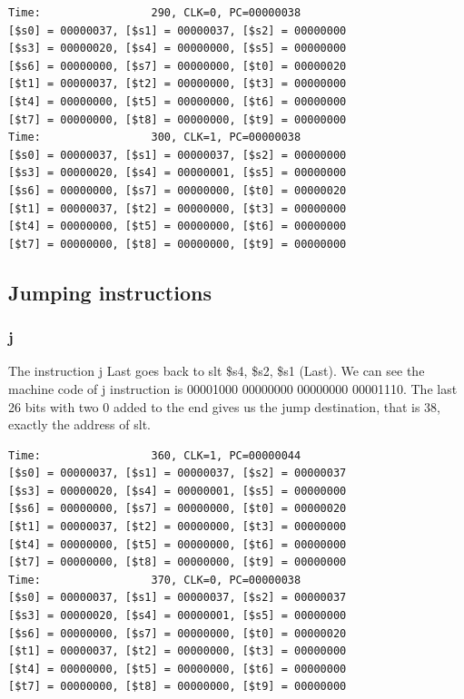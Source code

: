 \documentclass[a4paper,12pt]{article}
\begin{document}
\begin{lstlisting}
Time:                 290, CLK=0, PC=00000038
[$s0] = 00000037, [$s1] = 00000037, [$s2] = 00000000
[$s3] = 00000020, [$s4] = 00000000, [$s5] = 00000000
[$s6] = 00000000, [$s7] = 00000000, [$t0] = 00000020
[$t1] = 00000037, [$t2] = 00000000, [$t3] = 00000000
[$t4] = 00000000, [$t5] = 00000000, [$t6] = 00000000
[$t7] = 00000000, [$t8] = 00000000, [$t9] = 00000000
Time:                 300, CLK=1, PC=00000038
[$s0] = 00000037, [$s1] = 00000037, [$s2] = 00000000
[$s3] = 00000020, [$s4] = 00000001, [$s5] = 00000000
[$s6] = 00000000, [$s7] = 00000000, [$t0] = 00000020
[$t1] = 00000037, [$t2] = 00000000, [$t3] = 00000000
[$t4] = 00000000, [$t5] = 00000000, [$t6] = 00000000
[$t7] = 00000000, [$t8] = 00000000, [$t9] = 00000000
\end{lstlisting}

\subsection{Jumping instructions}
\subsubsection{j}
\par The instruction j Last goes back to slt \$s4, \$s2, \$s1 (Last). We can see the machine code of j instruction is 00001000 00000000 00000000 00001110. The last 26 bits with two 0 added to the end gives us the jump destination, that is 38, exactly the address of slt.
\begin{lstlisting}
Time:                 360, CLK=1, PC=00000044
[$s0] = 00000037, [$s1] = 00000037, [$s2] = 00000037
[$s3] = 00000020, [$s4] = 00000001, [$s5] = 00000000
[$s6] = 00000000, [$s7] = 00000000, [$t0] = 00000020
[$t1] = 00000037, [$t2] = 00000000, [$t3] = 00000000
[$t4] = 00000000, [$t5] = 00000000, [$t6] = 00000000
[$t7] = 00000000, [$t8] = 00000000, [$t9] = 00000000
Time:                 370, CLK=0, PC=00000038
[$s0] = 00000037, [$s1] = 00000037, [$s2] = 00000037
[$s3] = 00000020, [$s4] = 00000001, [$s5] = 00000000
[$s6] = 00000000, [$s7] = 00000000, [$t0] = 00000020
[$t1] = 00000037, [$t2] = 00000000, [$t3] = 00000000
[$t4] = 00000000, [$t5] = 00000000, [$t6] = 00000000
[$t7] = 00000000, [$t8] = 00000000, [$t9] = 00000000
\end{lstlisting}
\end{document}
